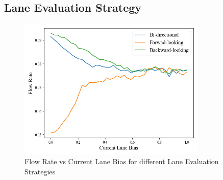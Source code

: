 \documentclass{article}
\begin{document}
\subsection{Lane Evaluation Strategy}

\begin{figure}[H]
    \centering
    \includegraphics[width=0.8\textwidth]{methods-bias.png}
    \begin{minipage}{0.8\textwidth}
        \caption{Flow Rate vs Current Lane Bias for different Lane Evaluation Strategies}
        \label{fig:lane_strategy_bias}
    \end{minipage}
\end{figure}
\end{document}
